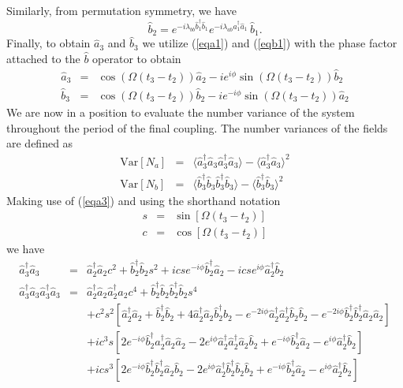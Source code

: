 \documentclass[12pt]{iopart}
\begin{document}
Similarly, from permutation symmetry, we have
\begin{equation}
\hat{b}_2 = e^{-i \lambda_{bb} \hat{b}_1^{\dagger} \hat{b}_1} e^{-i \lambda_{ab} \hat{a}_1^{\dagger} \hat{a}_1} \, \hat{b}_1.     
\label{eqb2}
\end{equation}
Finally, to obtain $\hat{a}_3$ and $\hat{b}_3$ we utilize (\ref{eqa1}) and (\ref{eqb1}) with the phase factor attached to the $\hat{b}$ operator to obtain
\begin{eqnarray}
\hat{a}_3 &=& \cos (\Omega (t_3-t_2)) \hat{a}_2 -i e^{i\phi} \sin (\Omega (t_3-t_2)) \hat{b}_2 \label{eqa3} \\
\hat{b}_3 &=& \cos (\Omega (t_3-t_2)) \hat{b}_2 - i e^{-i\phi} \sin (\Omega (t_3-t_2)) \hat{a}_2 \label{eqb3}
\end{eqnarray} 
We are now in a position to evaluate the number variance of the system throughout the period of the final coupling. The number variances of the fields are defined as
\begin{eqnarray}
{\mathrm{Var}}[N_a] &=& \langle \hat{a}^{\dagger}_3 \hat{a}_3 \hat{a}^{\dagger}_3 \hat{a}_3 \rangle - \langle \hat{a}^{\dagger}_3 \hat{a}_3 \rangle ^2 \label{eqNavariance} \\
%
{\mathrm{Var}}[N_b] &=& \langle \hat{b}^{\dagger}_3 \hat{b}_3 \hat{b}^{\dagger}_3 \hat{b}_3 \rangle - \langle \hat{b}^{\dagger}_3 \hat{b}_3 \rangle ^2
\label{eqNbvariance}
\end{eqnarray}
Making use of (\ref{eqa3}) and using the shorthand notation 
\begin{eqnarray}
s &=& \sin[\Omega (t_3 - t_2)] \\
c &=& \cos[\Omega (t_3 - t_2)]
\end{eqnarray}
we have
\begin{eqnarray}
\hat{a}^{\dagger}_3 \hat{a}_3 &=& \hat{a}^{\dagger}_2 \hat{a}_2 c^2 +  \hat{b}^{\dagger}_2 \hat{b}_2 s^2 + i c s e^{-i \phi} \hat{b}^{\dagger}_2 \hat{a}_2 - i c s e^{i \phi} \hat{a}^{\dagger}_2 \hat{b}_2 \\
%
%
\hat{a}^{\dagger}_3 \hat{a}_3 \hat{a}^{\dagger}_3 \hat{a}_3 &=& \hat{a}^{\dagger}_2 \hat{a}_2 \hat{a}^{\dagger}_2 \hat{a}_2 c^4 + \hat{b}^{\dagger}_2 \hat{b}_2 \hat{b}^{\dagger}_2 \hat{b}_2 s^4 \nonumber \\
%
&& + c^2 s^2 [ \hat{a}^{\dagger}_2 \hat{a}_2 + \hat{b}^{\dagger}_2 \hat{b}_2 + 4 \hat{a}^{\dagger}_2 \hat{a}_2 \hat{b}^{\dagger}_2 \hat{b}_2 -e^{-2 i \phi} \hat{a}^{\dagger}_2 \hat{a}^{\dagger}_2 \hat{b}_2 \hat{b}_2 -e^{-2 i \phi} \hat{b}^{\dagger}_2 \hat{b}^{\dagger}_2 \hat{a}_2 \hat{a}_2 ] \nonumber \\
%
&& + i c^3 s [2 e^{-i \phi} \hat{b}^{\dagger}_2 \hat{a}^{\dagger}_2 \hat{a}_2 \hat{a}_2 - 2 e^{i \phi} \hat{a}^{\dagger}_2 \hat{a}^{\dagger}_2 \hat{a}_2 \hat{b}_2 + e^{-i \phi} \hat{b}^{\dagger}_2 \hat{a}_2 - e^{i \phi} \hat{a}^{\dagger}_2 \hat{b}_2 ] \nonumber \\
%
&& + i c s^3 [2 e^{-i \phi} \hat{b}^{\dagger}_2 \hat{b}^{\dagger}_2 \hat{a}_2 \hat{b}_2 - 2 e^{i \phi} \hat{a}^{\dagger}_2 \hat{b}^{\dagger}_2 \hat{b}_2 \hat{b}_2 + e^{-i \phi} \hat{b}^{\dagger}_2 \hat{a}_2 - e^{i \phi} \hat{a}^{\dagger}_2 \hat{b}_2 ]
\end{eqnarray}
\end{document}
